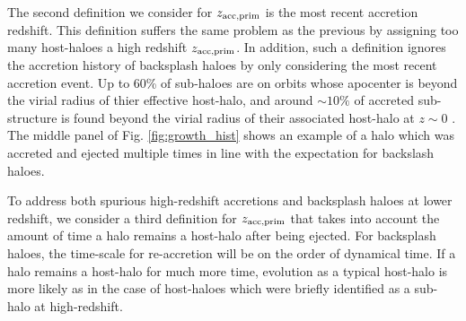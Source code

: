 \documentclass[a4paper,fleqn,usenatbib]{mnras}
\begin{document}
The second definition we consider for $z_{\rm acc, prim}$ is the most recent accretion redshift.  This definition suffers the same problem as the previous by assigning too many host-haloes a high redshift $z_{\rm acc, prim}$.  In addition, such a definition ignores the accretion history of backsplash haloes by only considering the most recent accretion event.  Up to 60\% of sub-haloes are on orbits whose apocenter is beyond the virial radius of thier effective host-halo, and around $\sim 10\%$ of accreted sub-structure is found beyond the virial radius of their associated host-halo at $z\sim 0$ \citep{Lin:2003bi, Gill:2005ge, Sales:2007kq, Ludlow:2009ix,  Wetzel:2014up, vandenBosch:2016uv}.  The middle panel of Fig. \ref{fig:growth_hist} shows an example of a halo which was accreted and ejected multiple times in line with the expectation for backslash haloes.  

To address both spurious high-redshift accretions and backsplash haloes at lower redshift, we consider a third definition for $z_{\rm acc, prim}$ that takes into account the amount of time a halo remains a host-halo after being ejected.  For backsplash haloes, the time-scale for re-accretion will be on the order of dynamical time.  If a halo remains a host-halo for much more time, evolution as a typical host-halo is more likely as in the case of host-haloes which were briefly identified as a sub-halo at high-redshift.
\end{document}
